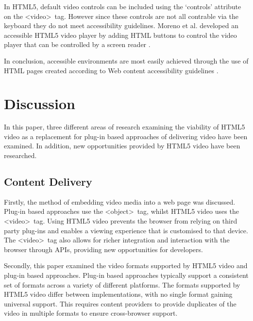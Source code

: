 \documentclass[journal]{IEEEtran}
\begin{document}

In HTML5, default video controls can be included using the `controls' attribute on the \textless video\textgreater~tag. However since these controls are not all contrable via the keyboard %
they do not meet accessibility guidelines. Moreno et al. developed an accessible HTML5 video player by adding HTML buttons to control the video player that can be controlled by a screen reader \cite{incollection:html5SupportForAnAccessibleWeb}.

In conclusion, accessible environments are most easily achieved through the use of HTML pages created according to Web content accessibility guidelines \cite{incollection:accessibilityEvaluationForMultimediaContent}.

\section{Discussion}
In this paper, three different areas of research examining the viability of HTML5 video as a replacement for plug-in based approaches of delivering video have been examined. In addition, new opportunities provided by HTML5 video have been researched.

\subsection{Content Delivery}
Firstly, the method of embedding video media into a web page was discussed. Plug-in based approaches use the \textless object\textgreater~tag, whilst HTML5 video uses the \textless video\textgreater~tag. Using HTML5 video prevents the browser from relying on third party plug-ins and enables a viewing experience that is customised to that device. The \textless video\textgreater~tag also allows for richer integration and interaction with the browser through APIs, providing new opportunities for developers.

Secondly, this paper examined the video formats supported by HTML5 video and plug-in based approaches. Plug-in based approaches typically support a consistent set of formats across a variety of different platforms. The formats supported by HTML5 video differ between implementations, with no single format gaining universal support. This requires content providers to provide duplicates of the video in multiple formats to ensure cross-browser support.
\end{document}
